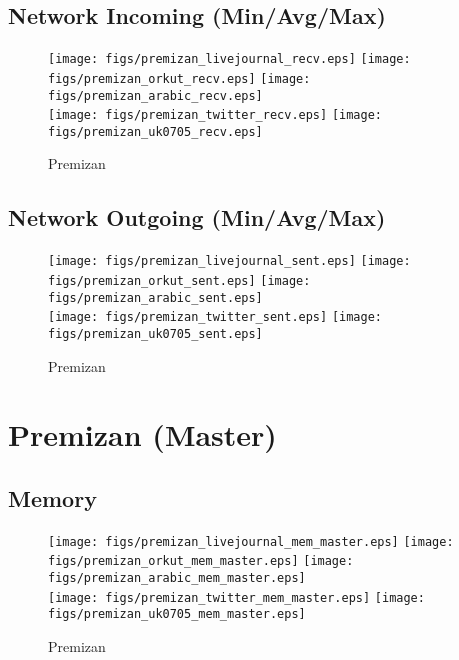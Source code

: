 \documentclass{article}
\newcommand{\bline}[1][1]{\vspace{#1\baselineskip}}
\begin{document}
\pagebreak
\subsection{Network Incoming (Min/Avg/Max)}
\begin{figure}[!h]
  \bline[1]
  \centering
  \texttt{[image: figs/premizan\_livejournal\_recv.eps]}\hspace{1em}%
  \texttt{[image: figs/premizan\_orkut\_recv.eps]}\hspace{1em}%
  \texttt{[image: figs/premizan\_arabic\_recv.eps]}\\
  \texttt{[image: figs/premizan\_twitter\_recv.eps]}\hspace{1em}%
  \texttt{[image: figs/premizan\_uk0705\_recv.eps]}
  \caption{Premizan}
\end{figure}

\pagebreak
\subsection{Network Outgoing (Min/Avg/Max)}
\begin{figure}[!h]
  \bline[1]
  \centering
  \texttt{[image: figs/premizan\_livejournal\_sent.eps]}\hspace{1em}%
  \texttt{[image: figs/premizan\_orkut\_sent.eps]}\hspace{1em}%
  \texttt{[image: figs/premizan\_arabic\_sent.eps]}\\
  \texttt{[image: figs/premizan\_twitter\_sent.eps]}\hspace{1em}%
  \texttt{[image: figs/premizan\_uk0705\_sent.eps]}
  \caption{Premizan}
\end{figure}


\pagebreak
\section{Premizan (Master)}
\label{sec:premizan-master}
\subsection{Memory}
\begin{figure}[!h]
  \centering
  \texttt{[image: figs/premizan\_livejournal\_mem\_master.eps]}\hspace{1em}%
  \texttt{[image: figs/premizan\_orkut\_mem\_master.eps]}\hspace{1em}%
  \texttt{[image: figs/premizan\_arabic\_mem\_master.eps]}\\
  \texttt{[image: figs/premizan\_twitter\_mem\_master.eps]}\hspace{1em}%
  \texttt{[image: figs/premizan\_uk0705\_mem\_master.eps]}
  \caption{Premizan}
\end{figure}
\end{document}
